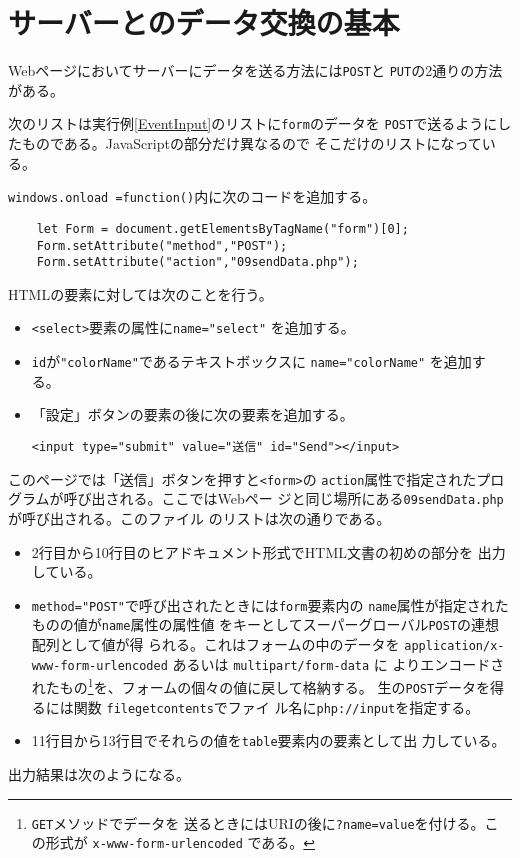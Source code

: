 \section{サーバーとのデータ交換の基本}
\iftrue
Webページにおいてサーバーにデータを送る方法には\texttt{POST}と
\texttt{PUT}の2通りの方法がある。
\begin{Exec}\upshape\label{dataexchange}
 次のリストは実行例\ref{EventInput}のリストに\texttt{form}のデータを
 \texttt{POST}で送るようにしたものである。JavaScriptの部分だけ異なるので
 そこだけのリストになっている。

\texttt{windows.onload =function()}内に次のコードを追加する。
\begin{Verbatim}
    let Form = document.getElementsByTagName("form")[0];
    Form.setAttribute("method","POST");
    Form.setAttribute("action","09sendData.php");
\end{Verbatim}
HTMLの要素に対しては次のことを行う。
\begin{itemize}
 \item \texttt{<select>}要素の属性に\Verb+name="select"+ を追加する。
 \item \texttt{id}が\Verb+"colorName"+であるテキストボックスに
       \Verb+name="colorName"+ を追加する。
 \item 「設定」ボタンの要素の後に次の要素を追加する。
\begin{center}
\Verb+<input type="submit" value="送信" id="Send"></input>+ 
\end{center}
\end{itemize}
このページでは「送信」ボタンを押すと\texttt{<form>}の
\texttt{action}属性で指定されたプログラムが呼び出される。ここではWebペー
 ジと同じ場所にある\texttt{09sendData.php}が呼び出される。このファイル
 のリストは次の通りである。
 \newcommand{\POST}{\texttt{\textdollar\textunderscore POST}}
\begin{itemize}
 \item 2行目から10行目のヒアドキュメント形式でHTML文書の初めの部分を
       出力している。
 \item \Verb+method="POST"+で呼び出されたときには\texttt{form}要素内の
       \texttt{name}属性が指定されたものの値が\texttt{name}属性の属性値
       をキーとしてスーパーグローバル\POST の連想配列として値が得
       られる。これはフォームの中のデータを
       \texttt{application/x-www-form-urlencoded} あるいは
       \texttt{multipart/form-data} に
       よりエンコードされたもの\footnote{\protect\texttt{GET}メソッドでデータを
       送るときにはURIの後に\protect\texttt{?name=value}を付ける。この形式が
       \protect\texttt{x-www-form-urlencoded} である。}を、フォームの個々の値に戻して格納する。
       生の\POST データを得るには関数
       \texttt{file\textunderscore get\textunderscore contents}でファイ
       ル名に\texttt{php://input}を指定する。
 \item 11行目から13行目でそれらの値を\texttt{table}要素内の要素として出
       力している。
\end{itemize}
出力結果は次のようになる。
\end{Exec}
